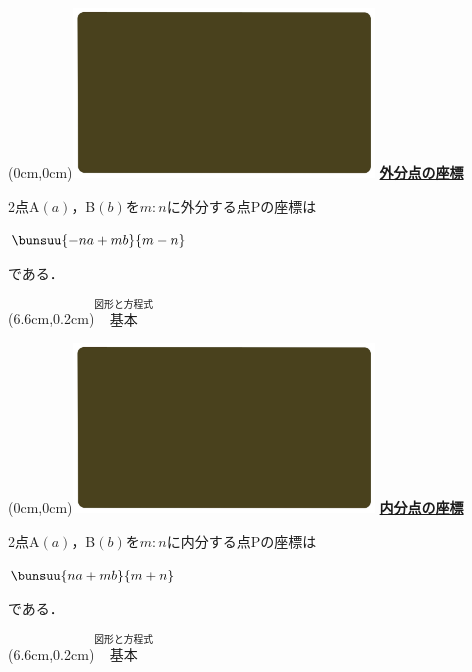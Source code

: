 \documentclass[10pt,
fleqn,
dvipdfmx,
uplatex
]{jsarticle}
\begin{document}
\newpage



\at(0cm,0cm){\includegraphics[width=8cm,bb=0 0 1920 1080]{./youtube/thumbnails/templates/smart_background/図形と方程式.jpeg}}
{\color{orange}\bf\boldmath\huge\underline{外分点の座標}}\vspace{0.3zw}

\large
2点A$(a)$，B$(b)$を$m:n$に外分する点Pの座標は

\Huge
\hspace{1zw}
$\bunsuu{-na+mb}{m-n}$

\large
\vspace{-1zw}
\hfill
である．

\at(6.6cm,0.2cm){\small\color{bradorange}$\overset{\text{図形と方程式}}{\text{基本}}$}


\newpage



\at(0cm,0cm){\includegraphics[width=8cm,bb=0 0 1920 1080]{./youtube/thumbnails/templates/smart_background/図形と方程式.jpeg}}
{\color{orange}\bf\boldmath\huge\underline{内分点の座標}}\vspace{0.3zw}

2点A$(a)$，B$(b)$を$m:n$に内分する点Pの座標は

\Huge
\hspace{1.4zw}
$\bunsuu{na+mb}{m+n}$

\large
\vspace{-1zw}
\hfill
である．

\at(6.6cm,0.2cm){\small\color{bradorange}$\overset{\text{図形と方程式}}{\text{基本}}$}


\newpage
\end{document}
